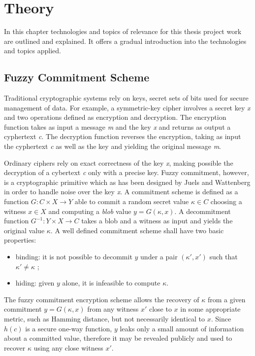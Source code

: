 \chapter{Theory}
\label{ch:theory}
In this chapter technologies and topics of relevance for this thesis project work are outlined and explained. It offers a gradual introduction into the technologies and topics applied.

\section{Fuzzy Commitment Scheme}
Traditional cryptographic systems rely on keys, secret sets of bits used for secure management of data. 
For example, a symmetric-key cipher involves a secret key \textit{x} and two operations defined as encryption and decryption.
The encryption function takes as input a message \textit{m} and the key \textit{x} and returns as output a cyphertext \textit{c}.
The decryption function reverses the encryption, taking as input the cyphertext \textit{c} as well as the key and yielding the original message \textit{m}.

Ordinary ciphers rely on exact correctness of the key \textit{x}, making possible the decryption of a cybertext \textit{c} only with a precise key.
Fuzzy commitment, however, is a cryptographic primitive which as has been designed by Juels and Wattenberg \cite{Juels2004AScheme} in order to handle noise over the key \textit{x}.
A commitment scheme is defined as a function $G : C \times X \xrightarrow{} Y$ able to commit a random secret value $\kappa \in C $ choosing a witness $x \in X$ and computing a \textit{blob} value  $y = G(\kappa,x)$.
A decommitment function $G^{-1}: Y \times X \xrightarrow{} C$ takes a blob and a witness as input and yields the original value $\kappa$.
A well defined commitment scheme shall have two basic properties:
\begin{itemize}
    \item binding: it is not possible to decommit $y$ under a pair $(\kappa', x')$ such that $\kappa' \neq \kappa$ ;
    \item hiding: given $y$ alone, it is infeasible to compute $\kappa$.
\end{itemize}
The fuzzy commitment encryption scheme allows the recovery of $\kappa$ from a given commitment $y=G(\kappa, x)$ from any witness $x'$ close to $x$ in some appropriate metric, such as Hamming distance, but not necessarily identical to $x$.
Since $h(c)$ is a secure one-way function, $y$ leaks only a small amount of information about a committed value, therefore it may be revealed publicly and used to recover $\kappa$ using any close witness $x'$.

